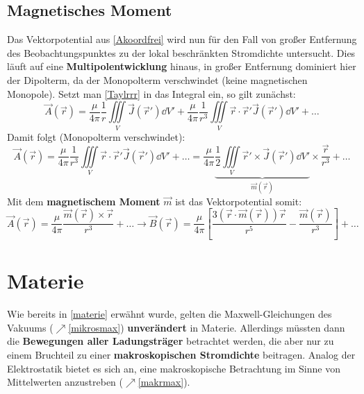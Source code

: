   \subsection{Magnetisches Moment}
		   Das Vektorpotential aus \ref{Akoordfrei} wird nun für den Fall von {großer Entfernung des Beobachtungspunktes zu der lokal beschränkten Stromdichte} untersucht. Dies läuft auf eine \textbf{Multipolentwicklung} hinaus, in großer Entfernung dominiert hier der Dipolterm, da der Monopolterm verschwindet (keine magnetischen Monopole). Setzt man \ref{Taylrrr} in das Integral ein, so gilt zunächst:
		   \begin{equation}
		   \vec{A}(\vec{r} ) = \frac{\mu}{4 \pi} \frac{1}{r}\iiint\limits_{V} \vec{J}(\vec{r}' ) \dd V'  + \frac{\mu}{4 \pi} \frac{1}{r^3}\iiint\limits_{V} \vec{r} \cdot \vec{r}'  \vec{J}(\vec{r}' ) \dd V' + \dots
		   \end{equation}
		    Damit folgt (Monopolterm verschwindet):
		         \begin{equation}
			        \vec{A}(\vec{r} ) = \frac{\mu}{4 \pi} \frac{1}{r^3}\iiint\limits_{V}\vec{r} \cdot \vec{r}'   \vec{J}(\vec{r}' ) \dd V' + \dots = \frac{\mu}{4 \pi} \underbrace{\frac{1}{2}\iiint\limits_{V} \vec{r}'  \times \vec{J}(\vec{r}' ) \dd V'}_{\vec{m}(\vec{r} )}  \times \frac{\vec{r} }{r^3}  + \dots
		        \end{equation}
		   Mit dem \textbf{magnetischem Moment} $\vec{m}$ ist das Vektorpotential somit:
		        \begin{equation}
			        \boxed{ \vec{A}(\vec{r} ) = \frac{\mu}{4 \pi} \frac{\vec{m}(\vec{r} )  \times \vec{r} }{r^3}  + \dots} \to \boxed{\vec{B} (\vec{r} ) = \frac{\mu}{4 \pi} \left[ \frac{3(\vec{r} \cdot \vec{m}(\vec{r} )) \vec{r}  }{r^5} -\frac{\vec{m}(\vec{r} )}{r^3}\right] + \dots}
		       \end{equation}

 \section{Materie}\label{magmaterial}
		  Wie bereits in \ref{materie} erwähnt wurde, gelten die Maxwell-Gleichungen des Vakuums ($\nearrow$\ref{mikrosmax}) \textbf{unverändert} in Materie. Allerdings müssten dann die \textbf{Bewegungen aller Ladungsträger} betrachtet werden, die aber nur zu einem Bruchteil zu einer \textbf{makroskopischen Stromdichte} beitragen. Analog der Elektrostatik bietet es sich an, eine makroskopische Betrachtung im Sinne von Mittelwerten anzustreben ($\nearrow$\ref{makrmax}).
